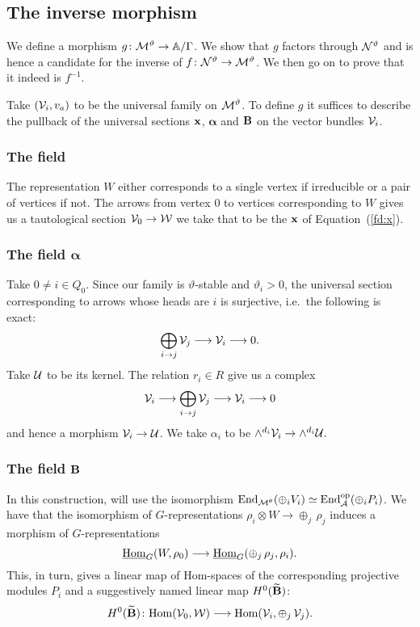 \documentclass{amsart}
\newcommand{\balpha}{\boldsymbol{\alpha}}
\theoremstyle{definition}
\begin{document}
\subsection{The inverse morphism}

We define a morphism  $g \colon \mathcal{M}^\vartheta \rightarrow \mathbb{A}/\Gamma$.
We show that $g$ factors through $\mathcal{N}^\vartheta$ and is hence a candidate for the inverse of $f \colon \mathcal{N}^\vartheta \rightarrow \mathcal{M}^\vartheta$.
We then go on to prove that it indeed is $f^{-1}$.

Take $(\mathcal{V}_i, v_a)$ to be the universal family on $\mathcal{M}^\vartheta$.
To define $g$ it suffices to describe the pullback of the universal sections $\mathbf{x}$, $\balpha$ and $\mathbf{B}$ on the vector bundles $\mathcal{V}_i$.

\subsubsection{The field \bfx}

The representation $W$ either corresponds to a single vertex if irreducible or a pair of vertices if not.
The arrows from vertex $0$ to vertices corresponding to $W$ gives us a tautological section $\mathcal{V}_0 \rightarrow \mathcal{W}$ we take that to be the $\mathbf{x}$ of Equation~(\ref{fd:x}).

\subsubsection{The field $\balpha$}\label{sssc:alpha}

Take $0 \neq i \in Q_0$.
Since our family is $\vartheta$-stable and $\vartheta_i>0$, the universal section corresponding to arrows whose heads are $i$ is surjective, i.e.\ the following is exact:
\begin{equation}\label{eq:k}
    \bigoplus_{i \rightarrow j} \mathcal{V}_j \longrightarrow \mathcal{V}_i \longrightarrow 0.
\end{equation}
Take $\mathcal{U}$ to be its kernel.
The relation $r_i \in R$ give us a complex
$$\mathcal{V}_i \longrightarrow \bigoplus_{i \rightarrow j} \mathcal{V}_j \longrightarrow \mathcal{V}_i \longrightarrow 0$$
and hence a morphism $\mathcal{V}_i \rightarrow \mathcal{U}$.
We take $\alpha_i$ to be $\wedge^{d_i} \mathcal{V}_i \rightarrow \wedge^{d_i}\mathcal{U}.$

\subsubsection{The field $\mathbf{B}$}
In this construction, will use the isomorphism $\operatorname{End}_{\mathcal{M}^\theta}(\oplus_i V_i) \simeq \operatorname{End}^{\text{op}}_{\mathcal{A}}(\oplus_i P_i)$.
We have that the isomorphism of $G$-representations $\rho_i \otimes W \rightarrow \oplus_j\, \rho_j$ induces a morphism of $G$-representations $$\underline{\operatorname{Hom}}_G(W,\rho_0) \longrightarrow \underline{\operatorname{Hom}}_G(\oplus_j \, \rho_j, \rho_i).$$
This, in turn, gives a linear map of Hom-spaces of the corresponding projective modules $P_i$ and a suggestively named linear map $H^0(\widetilde{\mathbf{B}})$:
\begin{equation}\label{eq:homsp}
    H^0(\widetilde{\mathbf{B}}) \colon {\operatorname{Hom}}(\mathcal{V}_0, \mathcal{W}) \longrightarrow {\operatorname{Hom}}(\mathcal{V}_i, \oplus_j \, \mathcal{V}_j).
\end{equation}
\end{document}

